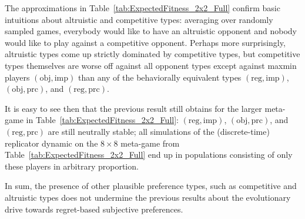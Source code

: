 \documentclass[fleqn,reqno,11pt]{article}
\newcommand{\myalert}[1]{\textcolor{red}{#1}}
\begin{document}
The approximations in Table~\ref{tab:ExpectedFitness_2x2_Full} confirm basic intuitions about
altruistic and competitive types: averaging over randomly sampled games, everybody would like
to have an altruistic opponent and nobody would like to play against a competitive
opponent. Perhaps more surprisingly, altruistic types come up strictly dominated by competitive
types, but competitive types themselves are worse off against all opponent types except against
maxmin players $(\text{obj}, \text{imp})$ than any of the behaviorally equivalent types
$(\text{reg}, \text{imp})$, $(\text{obj}, \text{prc})$, and
$(\text{reg}, \text{prc})$. 
\iffalse
This is a noteworthy results in the light of the fact that
evolving altruistic preferences have been shown to support cooperative behavior in a single
stage game \myalert{[CITE]}. In contrast,
averaging over payoffs in multiple stage games, like we do here, makes altruistic preferences
prime victims of evolutionary eradication.
\fi
It is easy to see then that the previous result still obtains for the larger meta-game in
Table~\ref{tab:ExpectedFitness_2x2_Full}: $(\text{reg}, \text{imp})$,
$(\text{obj}, \text{prc})$, and $(\text{reg}, \text{prc})$ are still neutrally stable;
all simulations of the (discrete-time) replicator dynamic on the $8 \times 8$ meta-game from
Table~\ref{tab:ExpectedFitness_2x2_Full} end up in populations consisting of only these players
in arbitrary proportion.

\iffalse

The following proposition (partially) confirms this result.\todo{rephrase to acknowledge all
  epistemic types?}

\begin{proposition} \label{proposition2}

Fix $\Lambda = \lbrace (\text{obj}, \text{imp}), (\text{reg}, \text{imp}), (\tau^{alt}, \text{imp}), (\tau^{com}, \text{imp}) \rbrace$ and $\mathcal{G}$ the class of symmetric $2 \times 2$ games with payoffs sampled from a finite, or compact and convex, set of i.i.d. values. Then, $(\text{reg}, \text{imp})$ is the only evolutionarily stable player in the population.

\end{proposition}

\begin{proof}
See Appendix.\todo{is this there already?}
\end{proof}

\fi


In sum, the presence of other plausible preference types, such as competitive and altruistic
types does not undermine the previous results about the evolutionary drive towards regret-based
subjective preferences.
\end{document}
